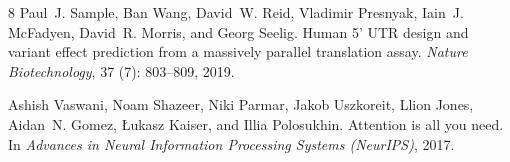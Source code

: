 \documentclass{article}
\begin{document}
\begin{thebibliography}{8}
Paul~J. Sample, Ban Wang, David~W. Reid, Vladimir Presnyak, Iain~J. McFadyen,
  David~R. Morris, and Georg Seelig.
\newblock Human 5' {UTR} design and variant effect prediction from a massively
  parallel translation assay.
\newblock \emph{Nature Biotechnology}, 37 (7): 803--809,
  2019.

Ashish Vaswani, Noam Shazeer, Niki Parmar, Jakob Uszkoreit, Llion Jones,
  Aidan~N. Gomez, {\L}ukasz Kaiser, and Illia Polosukhin.
\newblock Attention is all you need.
\newblock In \emph{Advances in Neural Information Processing Systems
  (NeurIPS)}, 2017.

\end{thebibliography}
\end{document}

